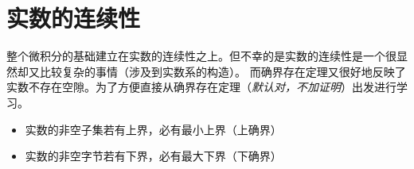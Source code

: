 \chapter{实数的连续性}
整个微积分的基础建立在实数的连续性之上。但不幸的是实数的连续性是一个很显然却又比较复杂的事情（涉及到实数系的构造）。
而确界存在定理又很好地反映了实数不存在空隙。为了方便直接从确界存在定理（\emph{默认对，不加证明}）出发进行学习。

\begin{theorem}[确界存在定理]
    \begin{itemize}
        \item 实数的非空子集若有上界，必有最小上界（上确界）
        \item 实数的非空字节若有下界，必有最大下界（下确界）
    \end{itemize}
\end{theorem}
